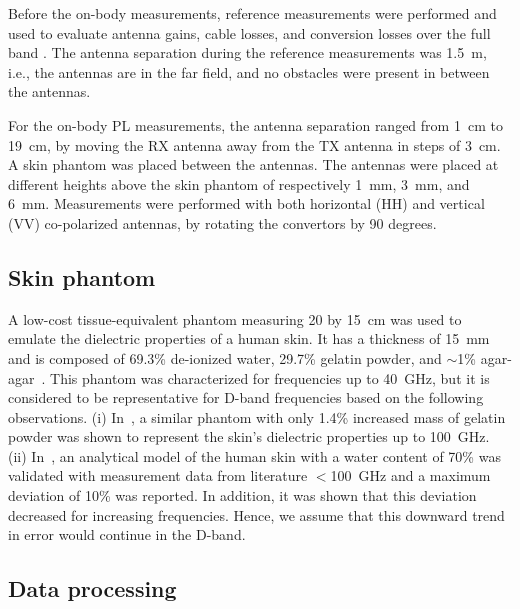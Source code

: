 \documentclass[preprint]{rsl}
\begin{document}
Before the on-body measurements, reference measurements were performed and used to evaluate antenna gains, cable losses, and conversion losses over the full band \cite{DeBeelde2021_eucap}. 
The antenna separation during the reference measurements was 1.5~m, i.e., the antennas are in the far field, and no obstacles were present in between the antennas. 

For the on-body PL measurements, the antenna separation ranged from 1~cm to 19~cm, by moving the RX antenna away from the TX antenna in steps of 3~cm.
A skin phantom was placed between the antennas. 
The antennas were placed at different heights above the skin phantom of respectively 1~mm, 3~mm, and 6~mm. 
Measurements were performed with both horizontal (HH) and vertical (VV) co-polarized antennas, by rotating the convertors by 90 degrees.

\subsection{Skin phantom}

A low-cost tissue-equivalent phantom measuring 20 by 15~cm was used to emulate the dielectric properties of a human skin. 
It has a thickness of 15~mm and is composed of 69.3\% de-ionized water, 29.7\% gelatin powder, and $\sim$1\% agar-agar~\cite{aminzadeh2014_ELetters}. 
This phantom was characterized for frequencies up to 40~GHz, but it is considered to be representative for D-band frequencies based on the following observations.
(i) In~\cite{aminzadeh2017_awpl}, a similar phantom with only 1.4\% increased mass of gelatin powder was shown to represent the skin's dielectric properties up to 100~GHz. 
(ii) In~\cite{aminzadeh2014_thesis}, an analytical model of the human skin with a water content of 70\% was validated with measurement data from literature $<$100~GHz and a maximum deviation of 10\% was reported. 
In addition, it was shown that this deviation decreased for increasing frequencies. Hence, we assume that this downward trend in error would continue in the D-band.

\subsection{Data processing}
\end{document}
